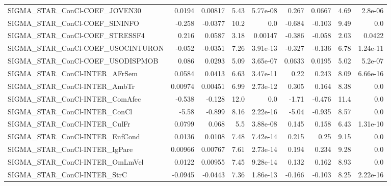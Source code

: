 \begin{tabular}{lrrrrrrrr}
SIGMA\_STAR\_ConCl-COEF\_JOVEN30          &      0.0194 &      0.00817 &    5.43 & 5.77e-08 &      0.267 &      0.0667 &         4.69 &       2.8e-06 \\
SIGMA\_STAR\_ConCl-COEF\_SININFO          &      -0.258 &      -0.0377 &    10.2 &      0.0 &     -0.684 &      -0.103 &         9.49 &           0.0 \\
SIGMA\_STAR\_ConCl-COEF\_STRESSF4         &       0.216 &       0.0587 &    3.18 &  0.00147 &     -0.386 &      -0.058 &         2.03 &        0.0422 \\
SIGMA\_STAR\_ConCl-COEF\_USOCINTURON      &      -0.052 &      -0.0351 &    7.26 & 3.91e-13 &     -0.327 &      -0.136 &         6.78 &      1.24e-11 \\
SIGMA\_STAR\_ConCl-COEF\_USODISPMOB       &       0.086 &       0.0293 &    5.09 & 3.65e-07 &     0.0633 &      0.0195 &         5.02 &       5.2e-07 \\
SIGMA\_STAR\_ConCl-INTER\_AFrSem          &      0.0584 &       0.0413 &    6.63 & 3.47e-11 &       0.22 &       0.243 &         8.09 &      6.66e-16 \\
SIGMA\_STAR\_ConCl-INTER\_AmbTr           &     0.00974 &      0.00451 &    6.99 & 2.73e-12 &      0.305 &       0.164 &         8.38 &           0.0 \\
SIGMA\_STAR\_ConCl-INTER\_ComAfec         &      -0.538 &       -0.128 &    12.0 &      0.0 &      -1.71 &      -0.476 &         11.4 &           0.0 \\
SIGMA\_STAR\_ConCl-INTER\_ConCl           &       -5.58 &       -0.899 &    8.16 & 2.22e-16 &      -5.04 &      -0.935 &         8.57 &           0.0 \\
SIGMA\_STAR\_ConCl-INTER\_CulFr           &      0.0799 &        0.068 &     5.5 & 3.88e-08 &      0.145 &       0.158 &         6.43 &      1.31e-10 \\
SIGMA\_STAR\_ConCl-INTER\_EnfCond         &      0.0136 &       0.0108 &    7.48 & 7.42e-14 &      0.215 &        0.25 &         9.15 &           0.0 \\
SIGMA\_STAR\_ConCl-INTER\_IgPare          &     0.00966 &      0.00767 &    7.61 & 2.73e-14 &      0.194 &       0.234 &         9.28 &           0.0 \\
SIGMA\_STAR\_ConCl-INTER\_OmLmVel         &      0.0122 &      0.00955 &    7.45 & 9.28e-14 &      0.132 &       0.162 &         8.93 &           0.0 \\
SIGMA\_STAR\_ConCl-INTER\_StrC            &     -0.0945 &      -0.0443 &    7.36 & 1.86e-13 &     -0.166 &      -0.103 &         8.25 &      2.22e-16 \\

\end{tabular}

